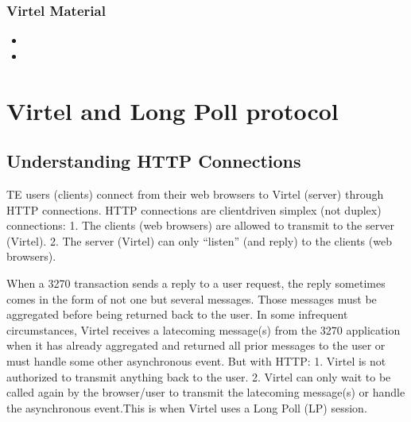 \documentclass[letterpaper,10pt,english]{sphinxmanual}
\begin{document}
\subsection{Virtel Material}
\label{\detokenize{connectivity_guide:virtel-material}}\begin{itemize}
\item {} 
\sphinxAtStartPar
{}

\item {} 
\sphinxAtStartPar
{}

\end{itemize}

\ignorespaces 

\chapter{Virtel and Long Poll protocol}
\label{\detokenize{connectivity_guide:virtel-and-long-poll-protocol}}\label{\detokenize{connectivity_guide:index-169}}

\section{Understanding HTTP Connections}
\label{\detokenize{connectivity_guide:understanding-http-connections}}
 TE users (clients) connect from their web browsers to Virtel (server) through HTTP connections. HTTP connections are client\sphinxhyphen{}driven simplex (not duplex) connections:
1.      The clients (web browsers) are allowed to transmit to the server (Virtel).
2.      The server (Virtel) can only “listen” (and reply) to the clients (web browsers).

\sphinxAtStartPar
When a 3270 transaction sends a reply to a user request, the reply sometimes comes in the form of not one but several messages. Those messages must be aggregated before being returned back to the user. In some infrequent circumstances, Virtel receives a late\sphinxhyphen{}coming message(s) from the 3270 application when it has already aggregated and returned all prior messages to the user or must handle some other asynchronous event. But with HTTP:
1.      Virtel is not authorized to transmit anything back to the user.
2.      Virtel can only wait to be called again by the browser/user to transmit the late\sphinxhyphen{}coming message(s) or handle the asynchronous event.This is when Virtel uses a Long Poll (LP) session.
\end{document}
